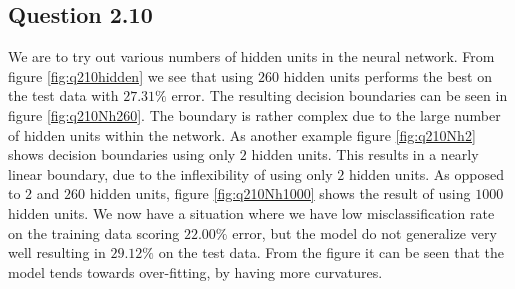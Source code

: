 \subsection*{Question 2.10}

We are to try out various numbers of hidden units in the neural
network. From figure \ref{fig:q210hidden} we see that using $260$
hidden units performs the best on the test data with $27.31\%$
error. The resulting decision boundaries can be seen in figure
\ref{fig:q210Nh260}. The boundary is rather complex due to the large
number of hidden units within the network. As another example figure
\ref{fig:q210Nh2} shows decision boundaries using only $2$ hidden
units. This results in a nearly linear boundary, due to the
inflexibility of using only $2$ hidden units. As opposed to $2$ and
$260$ hidden units, figure \ref{fig:q210Nh1000} shows the result of
using $1000$ hidden units. We now have a situation where we have low
misclassification rate on the training data scoring $22.00\%$ error,
but the model do not generalize very well resulting in $29.12\%$ on
the test data. From the figure it can be seen that the model tends
towards over-fitting, by having more curvatures.

